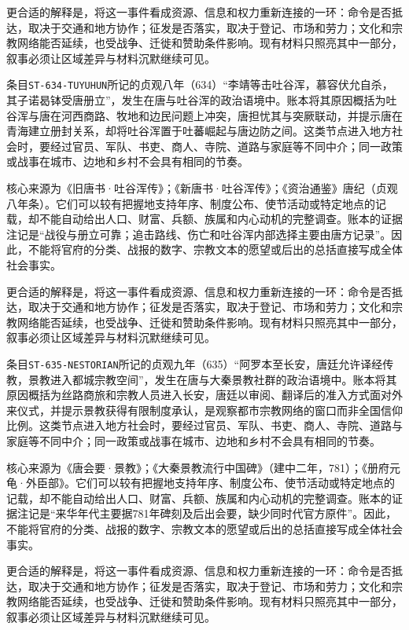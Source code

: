 更合适的解释是，将这一事件看成资源、信息和权力重新连接的一环：命令是否抵达，取决于交通和地方协作；征发是否落实，取决于登记、市场和劳力；文化和宗教网络能否延续，也受战争、迁徙和赞助条件影响。现有材料只照亮其中一部分，叙事必须让区域差异与材料沉默继续可见。


条目\texttt{ST-634-TUYUHUN}所记的贞观八年（634）“李靖等击吐谷浑，慕容伏允自杀，其子诺曷钵受唐册立”，发生在唐与吐谷浑的政治语境中。账本将其原因概括为吐谷浑与唐在河西商路、牧地和边民问题上冲突，唐担忧其与突厥联动，并提示唐在青海建立册封关系，却将吐谷浑置于吐蕃崛起与唐边防之间。这类节点进入地方社会时，要经过官员、军队、书吏、商人、寺院、道路与家庭等不同中介；同一政策或战事在城市、边地和乡村不会具有相同的节奏。

核心来源为《旧唐书·吐谷浑传》；《新唐书·吐谷浑传》；《资治通鉴》唐纪（贞观八年条）。它们可以较有把握地支持年序、制度公布、使节活动或特定地点的记载，却不能自动给出人口、财富、兵额、族属和内心动机的完整调查。账本的证据注记是“战役与册立可靠；追击路线、伤亡和吐谷浑内部选择主要由唐方记录”。因此，不能将官府的分类、战报的数字、宗教文本的愿望或后出的总括直接写成全体社会事实。

更合适的解释是，将这一事件看成资源、信息和权力重新连接的一环：命令是否抵达，取决于交通和地方协作；征发是否落实，取决于登记、市场和劳力；文化和宗教网络能否延续，也受战争、迁徙和赞助条件影响。现有材料只照亮其中一部分，叙事必须让区域差异与材料沉默继续可见。


条目\texttt{ST-635-NESTORIAN}所记的贞观九年（635）“阿罗本至长安，唐廷允许译经传教，景教进入都城宗教空间”，发生在唐与大秦景教社群的政治语境中。账本将其原因概括为丝路商旅和宗教人员进入长安，唐廷以审阅、翻译后的准入方式面对外来仪式，并提示景教获得有限制度承认，是观察都市宗教网络的窗口而非全国信仰比例。这类节点进入地方社会时，要经过官员、军队、书吏、商人、寺院、道路与家庭等不同中介；同一政策或战事在城市、边地和乡村不会具有相同的节奏。

核心来源为《唐会要·景教》；《大秦景教流行中国碑》（建中二年，781）；《册府元龟·外臣部》。它们可以较有把握地支持年序、制度公布、使节活动或特定地点的记载，却不能自动给出人口、财富、兵额、族属和内心动机的完整调查。账本的证据注记是“来华年代主要据781年碑刻及后出会要，缺少同时代官方原件”。因此，不能将官府的分类、战报的数字、宗教文本的愿望或后出的总括直接写成全体社会事实。

更合适的解释是，将这一事件看成资源、信息和权力重新连接的一环：命令是否抵达，取决于交通和地方协作；征发是否落实，取决于登记、市场和劳力；文化和宗教网络能否延续，也受战争、迁徙和赞助条件影响。现有材料只照亮其中一部分，叙事必须让区域差异与材料沉默继续可见。

